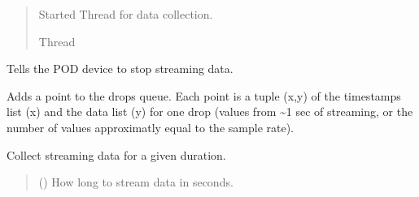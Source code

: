 \documentclass[letterpaper,10pt,english]{sphinxmanual}
\begin{document}
\begin{fulllineitems}
\begin{fulllineitems}
\begin{quote}
\begin{description}
\sphinxAtStartPar
Started Thread for data collection.

\sphinxAtStartPar
Thread

\end{description}\end{quote}

\end{fulllineitems}


\begin{fulllineitems}
\label{\detokenize{Morelia.Stream.Collect:Morelia.Stream.Collect.DataBucket.Bucket.StopCollecting}}
\pysigstartsignatures
{}
\pysigstopsignatures
\sphinxAtStartPar
Tells the POD device to stop streaming data.

\end{fulllineitems}


\begin{fulllineitems}
\label{\detokenize{Morelia.Stream.Collect:Morelia.Stream.Collect.DataBucket.Bucket._CollectDrop}}
\pysigstartsignatures
{}
\pysigstopsignatures
\sphinxAtStartPar
Adds a point to the drops queue. Each point is a tuple (x,y) of the         timestamps list (x) and the data list (y) for one drop (values from         \textasciitilde{}1 sec of streaming, or the number of values approximatly equal to         the sample rate).

\end{fulllineitems}


\begin{fulllineitems}
\label{\detokenize{Morelia.Stream.Collect:Morelia.Stream.Collect.DataBucket.Bucket._CollectForDuration}}
\pysigstartsignatures
{}
\pysigstopsignatures
\sphinxAtStartPar
Collect streaming data for a given duration.
\begin{quote}\begin{description}
\sphinxAtStartPar
{} () \textendash{} How long to stream data in seconds.


\end{description}
\end{quote}
\end{fulllineitems}
\end{fulllineitems}
\end{document}
